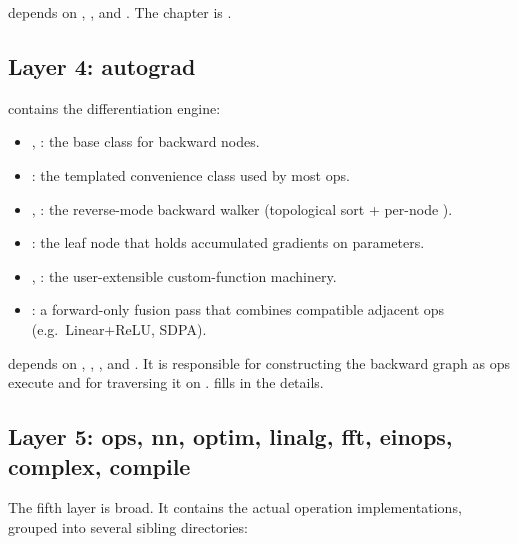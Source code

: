  depends on , , and
. The chapter is .

\subsection{Layer 4: autograd}
\label{ssec:layered_dag:autograd}

 contains the differentiation engine:

\begin{itemize}
  \item {}, : the base class for
    backward nodes.
  \item {}: the templated convenience class
    used by most ops.
  \item {}, : the reverse-mode
    backward walker (topological sort + per-node ).
  \item {}: the leaf node that holds
    accumulated gradients on parameters.
  \item {}, : the
    user-extensible custom-function machinery.
  \item {}: a forward-only fusion pass
    that combines compatible adjacent ops (e.g.\ Linear+ReLU,
    SDPA).
\end{itemize}

 depends on , ,
, and . It is responsible for
constructing the backward graph as ops execute and for traversing
it on .  fills in the
details.

\subsection{Layer 5: ops, nn, optim, linalg, fft, einops, complex,
compile}
\label{ssec:layered_dag:ops}

The fifth layer is broad. It contains the actual operation
implementations, grouped into several sibling directories:

